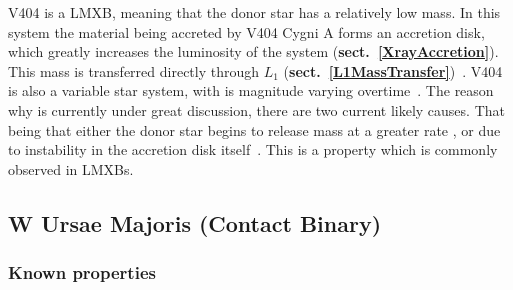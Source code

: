 \documentclass[12pt, a4paper]{article}
\begin{document}
        V404 is a LMXB, meaning that the donor star has a relatively low mass. In this system the material being accreted by V404 Cygni A forms an accretion disk, which greatly increases the luminosity of the system (\textbf{sect.~\ref{XrayAccretion}}). This mass is transferred directly through $L_1$ (\textbf{sect.~\ref{L1MassTransfer}})~\parencite{Bartolomeo_2023}. V404 is also a variable star system, with is magnitude varying overtime~\parencite{Bernardini_2016}. The reason why is currently under great discussion, there are two current likely causes. That being that either the donor star begins to release mass at a greater rate \parencite{TanakaLewin_1995}, or due to instability in the accretion disk itself~\parencite{Lasota_2001}. This is a property which is commonly observed in LMXBs. 


    \subsection{W Ursae Majoris (Contact Binary)}
        \subsubsection{Known properties}
\end{document}

